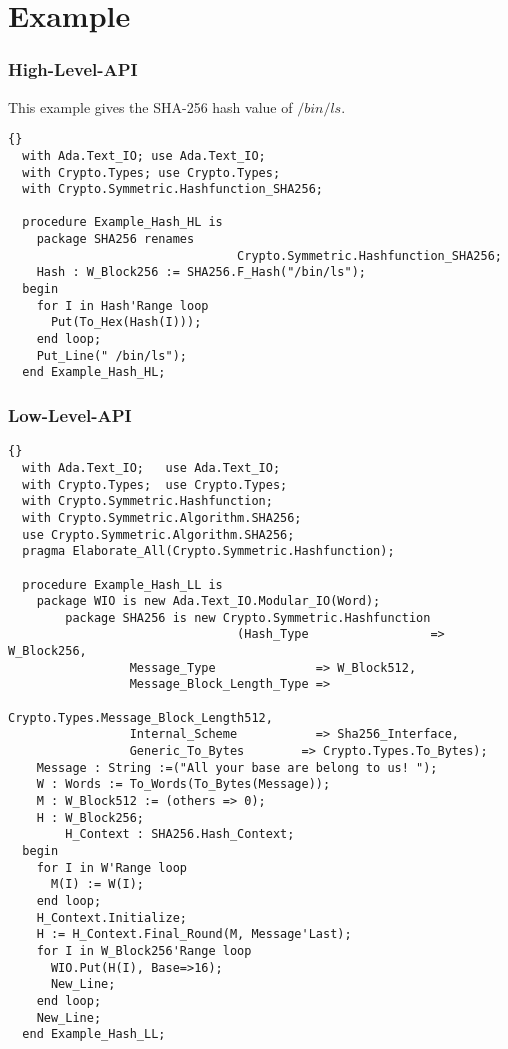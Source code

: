 
\section{Example}
\subsubsection*{High-Level-API}
This example gives the SHA-256 hash value of $/bin/ls$.
\begin{lstlisting}{}
  with Ada.Text_IO; use Ada.Text_IO;
  with Crypto.Types; use Crypto.Types;
  with Crypto.Symmetric.Hashfunction_SHA256;

  procedure Example_Hash_HL is
    package SHA256 renames
    							Crypto.Symmetric.Hashfunction_SHA256;
    Hash : W_Block256 := SHA256.F_Hash("/bin/ls");
  begin
    for I in Hash'Range loop
      Put(To_Hex(Hash(I)));
    end loop;
    Put_Line(" /bin/ls");
  end Example_Hash_HL;
\end{lstlisting}
\subsubsection*{Low-Level-API}
\begin{lstlisting}{}
  with Ada.Text_IO;   use Ada.Text_IO;
  with Crypto.Types;  use Crypto.Types;
  with Crypto.Symmetric.Hashfunction;
  with Crypto.Symmetric.Algorithm.SHA256;
  use Crypto.Symmetric.Algorithm.SHA256;
  pragma Elaborate_All(Crypto.Symmetric.Hashfunction);

  procedure Example_Hash_LL is
    package WIO is new Ada.Text_IO.Modular_IO(Word);
		package SHA256 is new Crypto.Symmetric.Hashfunction
								(Hash_Type                 => W_Block256,
                 Message_Type              => W_Block512,
                 Message_Block_Length_Type => 
								     Crypto.Types.Message_Block_Length512,
                 Internal_Scheme           => Sha256_Interface,
                 Generic_To_Bytes	     => Crypto.Types.To_Bytes);
    Message : String :=("All your base are belong to us! ");
    W : Words := To_Words(To_Bytes(Message));
    M : W_Block512 := (others => 0);
    H : W_Block256;
		H_Context : SHA256.Hash_Context;
  begin
    for I in W'Range loop
      M(I) := W(I);
    end loop;
    H_Context.Initialize;
    H := H_Context.Final_Round(M, Message'Last);
    for I in W_Block256'Range loop
      WIO.Put(H(I), Base=>16);
      New_Line;
    end loop;
    New_Line;
  end Example_Hash_LL;
\end{lstlisting}
